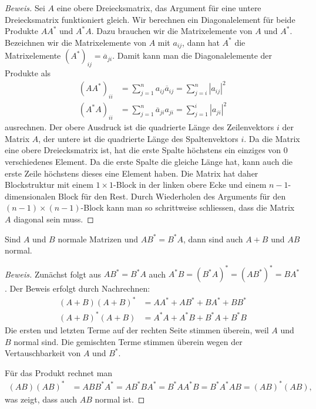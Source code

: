 \begin{proof}[Beweis]
Sei $A$ eine obere Dreiecksmatrix, das Argument für eine untere Dreiecksmatrix
funktioniert gleich.
Wir berechnen ein Diagonalelement für beide Produkte $AA^*$ und $A^*A$.
Dazu brauchen wir die Matrixelemente von $A$ und $A^*$.
Bezeichnen wir die Matrixelemente von $A$ mit $a_{i\!j}$, dann hat $A^*$
die Matrixelemente $(A^*)_{i\!j}=\overline{a}_{ji}$.
Damit kann man die Diagonalelemente der Produkte als
\begin{align*}
(AA^*)_{ii}
&=
\sum_{j=1}^n a_{i\!j}\overline{a}_{i\!j}
=
\sum_{j=i}^n |a_{i\!j}|^2
\\
(A^*A)_{ii}
&=
\sum_{j=1}^n \overline{a}_{ji}a_{ji}
=
\sum_{j=1}^i |a_{ji}|^2
\end{align*}
ausrechnen.
Der obere Ausdruck ist die quadrierte Länge des Zeilenvektors $i$ der Matrix $A$,
der untere ist die quadrierte Länge des Spaltenvektors $i$.
Da die Matrix eine obere Dreiecksmatrix ist, hat die erste Spalte höchstens
ein einziges von $0$ verschiedenes Element.
Da die erste Spalte die gleiche Länge hat,
kann auch die erste Zeile höchstens dieses eine Element haben.
Die Matrix hat daher Blockstruktur mit einem $1\times 1$-Block in der
linken obere Ecke und einem  $n-1$-dimensionalen Block für den Rest.
Durch Wiederholen des Arguments für den $(n-1)\times (n-1)$-Block 
kann man so schrittweise schliessen, dass die Matrix $A$ diagonal sein muss.
\end{proof}


\begin{satz}
Sind $A$ und $B$ normale Matrizen und $AB^*=B^*A$, dann sind auch $A+B$
und $AB$ normal.
\end{satz}

\begin{proof}[Beweis]
Zunächst folgt aus $AB^*=B^*A$ auch
$A^*B = (B^*A)^* = (AB^*)^* = BA^*$.
Der Beweis erfolgt durch Nachrechnen:
\begin{align*}
(A+B)(A+B)^*
&=
AA^* + AB^* + BA^*+BB^*
\\
(A+B)^*(A+B)
&=
A^*A + A^*B + B^*A + B^*B
\end{align*}
Die ersten und letzten Terme auf der rechten Seite stimmen überein, weil
$A$ und $B$ normal sind.
Die gemischten Terme stimmen überein wegen der Vertauschbarkeit von
$A$ und $B^*$.

Für das Produkt rechnet man
\begin{align*}
(AB)(AB)^*
&= ABB^*A^* = AB^*BA^*
= B^*AA^*B
=
B^*A^*AB
=
(AB)^*(AB),
\end{align*}
was zeigt, dass auch $AB$ normal ist.
\end{proof}

